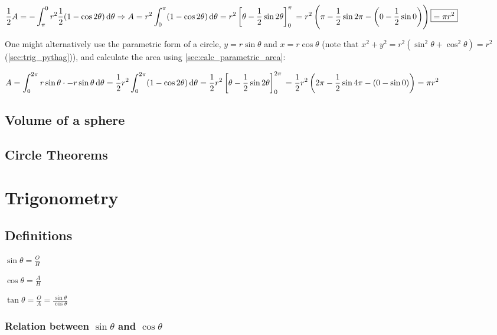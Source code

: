 \documentclass[a4paper,11pt]{article}
\begin{document}
    $\displaystyle \frac 12 A = -\int_\pi^0
        r^2 \frac 12 (1 - \cos 2 \theta) \dif \theta \Rightarrow
     A = r^2 \int_0^\pi (1 - \cos 2 \theta) \dif \theta =
     r^2\left[\theta - \frac 12 \sin 2 \theta \right]_0^\pi
     \\= r^2 \left(\pi - \frac 12 \sin 2 \pi -
                   \left(0 - \frac 12 \sin 0\right)\right) \boxed{= \pi r^2}$

    One might alternatively use the parametric form of a circle,
    $y = r \sin \theta$ and $x = r \cos \theta$
    (note that $x^2 + y^2 = r^2(\sin^2 \theta + \cos^2 \theta) = r^2$
    (\ref{sec:trig_pythag})), and calculate the area using
    \ref{sec:calc_parametric_area}:

    $\displaystyle A = \int_0^{2\pi}
        r \sin \theta \cdot -r \sin \theta \dif \theta =
     \frac 12 r^2 \int_0^{2\pi} (1 - \cos 2 \theta) \dif \theta =
     \frac 12 r^2 \left[\theta - \frac 12 \sin 2 \theta\right]_0^{2\pi}
     \\= \frac 12 r^2 \left(2\pi - \frac 12 \sin 4 \pi -
                      \left(0 - \sin 0\right)\right) = \pi r^2$

    \subsection{Volume of a sphere}

    \subsection{Circle Theorems}

    \section{Trigonometry}

    \subsection{Definitions} \label{sec:trig_definitions}


    $\displaystyle\sin \theta = \frac OH$

    $\displaystyle\cos \theta = \frac AH$

    $\displaystyle\tan \theta = \frac OA = \frac{\sin \theta}{\cos \theta}$

    \subsubsection[Relation between $\sin \theta$ and $\cos \theta$]
                  {Relation between \boldmath$\sin \theta$ and $\cos \theta$}
    \label{sec:trig_sin_cos_relation}
\end{document}
